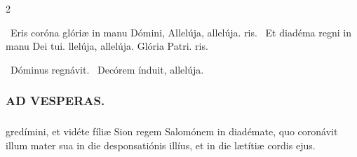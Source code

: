 \documentclass[9pt,twoside]{extarticle}
\begin{document}
\begin{multicols}{2}
{{\begin{tightlist}{}
\item {}~Eris coróna glóriæ in manu Dómini, \textred{*} Allelúja, allelúja. ris. ~Et diadéma regni in manu Dei tui. llelúja, allelúja. Glória Patri. ris.
\item {}~Dóminus regnávit. ~Decórem índuit, allelúja.
\end{tightlist}

\subsubsection*{\center \textsc{AD VESPERAS.}}
\begin{tightlist}{}
\item {}
\end{tightlist}

\subsubsection*{}
gredímini, et vidéte fíliæ Sion regem Salomónem in diadémate, quo coronávit illum mater sua in die desponsatiónis illíus, et in die lætítiæ cordis ejus.

}}
\end{multicols}
\end{document}
